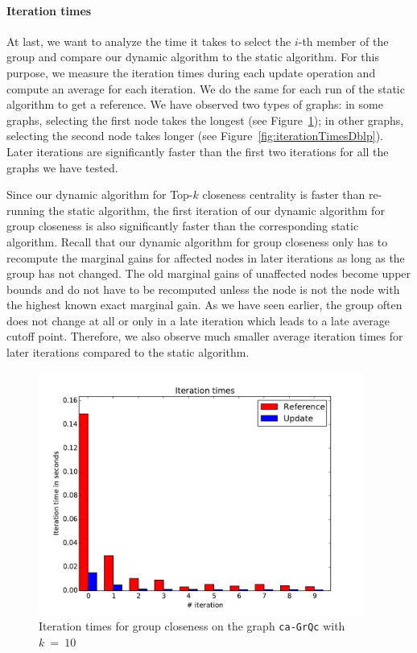 \paragraph{Iteration times}
At last, we want to analyze the time it takes to select the $i$-th member of the group and compare our dynamic algorithm to the static algorithm. For this purpose, we measure the iteration times during each update operation and compute an average for each iteration. We do the same for each run of the static algorithm to get a reference.  We have observed two types of graphs: in some graphs, selecting the first node takes the longest (see Figure~\ref{fig:iterationTimesCaGrQc}); in other graphs, selecting the second node takes longer (see Figure~\ref{fig:iterationTimesDblp}). Later iterations are significantly faster than the first two iterations for all the graphs we have tested.

Since our dynamic algorithm for Top-$k$ closeness centrality is faster than re-running the static algorithm, the first iteration of our dynamic algorithm for group closeness is also significantly faster than the corresponding static algorithm. Recall that our dynamic algorithm for group closeness only has to recompute the marginal gains for affected nodes in later iterations as long as the group has not changed. The old marginal gains of unaffected nodes become upper bounds and do not have to be recomputed unless the node is not the node with the highest known exact marginal gain. As we have seen earlier, the group often does not change at all or only in a late iteration which leads to a late average cutoff point. Therefore, we also observe much smaller average iteration times for later iterations compared to the static algorithm.


\begin{figure}[h!]
	\includegraphics[width=0.95\textwidth]{figures/iterations_ca-GrQc_10}
	\caption{Iteration times for group closeness on the graph \texttt{ca-GrQc} with $k~=~10$}
	\label{fig:iterationTimesCaGrQc}
\end{figure}

